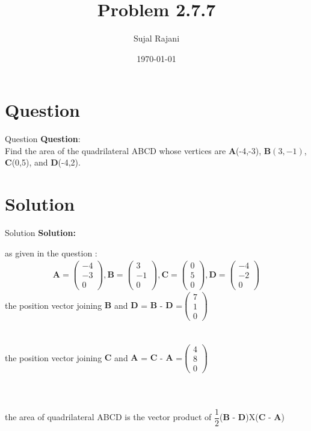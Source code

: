 \documentclass{beamer}
\title{Problem 2.7.7}
\author{Sujal Rajani}
\date{\today}
\let\vec\mathbf
\theoremstyle{remark}
\newcommand{\myvec}[1]{\ensuremath{\begin{pmatrix}#1\end{pmatrix}}}
\numberwithin{equation}{section}
\begin{document}
\begin{frame}
\titlepage
\end{frame}


\section{Question}
\begin{frame}{Question}
\textbf{Question}:
\\

\noindent Find the area of the quadrilateral ABCD whose vertices are $\vec A$(-4,-3), $\vec B(3,-1)$,$\vec C$(0,5), and $\vec D$(-4,2).
\end{frame}
\section{Solution}
\begin{frame}{Solution}
\textbf{Solution:} 

as given in the question :
\begin{align*}
     \vec{A}=\myvec{-4\\-3\\0},
     \vec{B}=\myvec{3\\-1\\0},
     \vec{C}=\myvec{0\\5\\0},
     \vec{D}=\myvec{-4\\-2\\0}
\end{align*}
the position vector joining $\vec{B}$ and $\vec{D}$ =  $\vec{B}$ -  $\vec{D}$ =$\myvec{7\\1\\0}$ 
\\
\\
\\
the position vector joining $\vec{C}$ and $\vec{A}$ =  $\vec{C}$ -  $\vec{A}$ =$\myvec{4\\8\\0}$
\\
\\
\\
\\
the area of quadrilateral ABCD is the vector  product of $\dfrac{1}{2}$($\vec{B}$ -  $\vec{D}$)X($\vec{C}$ -  $\vec{A}$)
\\  
\end{frame}
\end{document}
